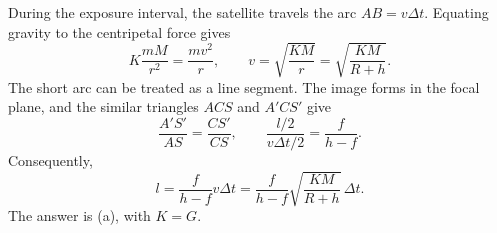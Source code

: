 During the exposure interval, the satellite travels the arc
$AB=v\Delta t$. Equating gravity to the centripetal force gives
\[
K\frac{mM}{r^2}=\frac{mv^2}{r},\qquad
v=\sqrt{\frac{KM}{r}}=\sqrt{\frac{KM}{R+h}}.
\]
The short arc can be treated as a line segment. The image forms in the focal
plane, and the similar triangles $ACS$ and $A'CS'$ give
\[
\frac{A'S'}{AS}=\frac{CS'}{CS},\qquad
\frac{l/2}{v\Delta t/2}=\frac{f}{h-f}.
\]
Consequently,
\[
l=\frac{f}{h-f}v\Delta t
=\frac{f}{h-f}\sqrt{\frac{KM}{R+h}}\,\Delta t.
\]
The answer is (a), with $K=G$.

